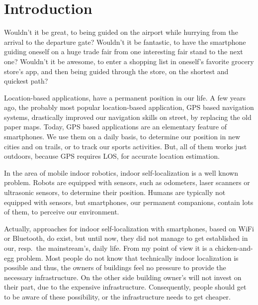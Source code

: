 \chapter{Introduction} \label{chap:intro}

Wouldn't it be great, to being guided on the airport while hurrying from the arrival to the departure gate? Wouldn't it be fantastic, to have the smartphone guiding oneself on a huge trade fair from one interesting fair stand to the next one? Wouldn't it be awesome, to enter a shopping list in oneself's favorite grocery store's app, and then being guided through the store, on the shortest and quickest path?

Location-based applications, have a permanent position in our life. A few years ago, the probably most popular location-based application, \acs{GPS} based navigation systems, drastically improved our navigation skills on street, by replacing the old paper maps. Today, \acs{GPS} based applications are an elementary feature of smartphones. We use them on a daily basis, to determine our position in new cities and on trails, or to track our sports activities. But, all of them works just outdoors, because \acs{GPS} requires \acl{LOS}, for accurate location estimation.

In the area of mobile indoor robotics, indoor self-localization is a well known problem. Robots are equipped with sensors, such as odometers, laser scanners or ultrasonic sensors, to determine their position. Humans are typically not equipped with sensors, but smartphones, our permanent companions, contain lots of them, to perceive our environment.

Actually, approaches for indoor self-localization with smartphones, based on WiFi or Bluetooth, do exist, but until now, they did not manage to get established in our, resp.\ the mainstream's, daily life. From my point of view it is a chicken-and-egg problem. Most people do not know that technically indoor localization is possible and thus, the owners of buildings feel no pressure to provide the necessary infrastructure. On the other side building owner's will not invest on their part, due to the expensive infrastructure. Consequently, people should get to be aware of these possibility, or the infrastructure needs to get cheaper.

